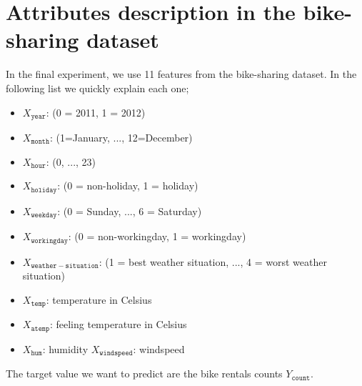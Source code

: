 \documentclass[runningheads, envcountsame, a4paper]{llncs}
\begin{document}
\section{Attributes description in the bike-sharing dataset}

In the final experiment, we use 11 features from the bike-sharing
dataset. In the following list we quickly explain each one;

\begin{itemize}
\item \( X_{\mathtt{year}}\): (0 = 2011, 1 = 2012)
\item \( X_{\mathtt{month}}\): (1=January, ..., 12=December)
\item \( X_{\mathtt{hour}}\): (0, ..., 23)
\item \( X_{\mathtt{holiday}}\): (0 = non-holiday, 1 = holiday)
\item \( X_{\mathtt{weekday}}\): (0 = Sunday, ..., 6 = Saturday)
\item \( X_{\mathtt{workingday}}\): (0 = non-workingday, 1 = workingday)
\item \( X_{\mathtt{weather-situation}}\): (1 = best weather situation, ..., 4 = worst weather situation)
\item \( X_{\mathtt{temp}}\): temperature in Celsius
\item \( X_{\mathtt{atemp}}\): feeling temperature in Celsius
\item \( X_{\mathtt{hum}}\): humidity
\( X_{\mathtt{windspeed}}\): windspeed
\end{itemize}

The target value we want to predict are the bike rentals counts
\( Y_{\mathtt{count}}\).
\end{document}
